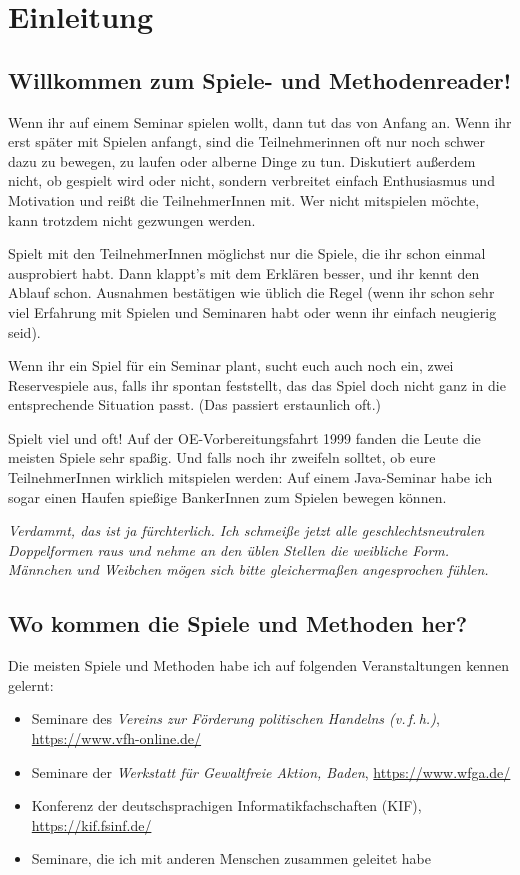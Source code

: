\chapter{Einleitung}
\section{Willkommen zum Spiele- und Methodenreader!}

Wenn ihr auf einem Seminar spielen wollt, dann tut das von Anfang an. Wenn ihr erst später mit Spielen anfangt, sind die Teilnehmerinnen oft nur noch schwer dazu zu bewegen, zu laufen oder alberne Dinge zu tun. Diskutiert außerdem nicht, ob gespielt wird oder nicht, sondern verbreitet einfach Enthusiasmus und Motivation und reißt die TeilnehmerInnen mit. Wer nicht mitspielen möchte, kann trotzdem nicht gezwungen werden.

Spielt mit den TeilnehmerInnen möglichst nur die Spiele, die ihr schon einmal ausprobiert habt. Dann klappt's mit dem Erklären besser, und ihr kennt den Ablauf schon. Ausnahmen bestätigen wie üblich die Regel (wenn ihr schon sehr viel Erfahrung mit Spielen und Seminaren habt oder wenn ihr einfach neugierig seid).

Wenn ihr ein Spiel für ein Seminar plant, sucht euch auch noch ein, zwei Reservespiele aus, falls ihr spontan feststellt, das das Spiel doch nicht ganz in die entsprechende Situation passt. (Das passiert erstaunlich oft.)

Spielt viel und oft! Auf der OE-Vorbereitungsfahrt 1999 fanden die Leute die meisten Spiele sehr spaßig. Und falls noch ihr zweifeln solltet, ob eure TeilnehmerInnen wirklich mitspielen werden: Auf einem Java-Seminar habe ich sogar einen Haufen spießige BankerInnen zum Spielen bewegen können.

\emph{Verdammt, das ist ja fürchterlich. Ich schmeiße jetzt alle geschlechtsneutralen Doppelformen raus und nehme an den üblen Stellen die weibliche Form. Männchen und Weibchen mögen sich bitte gleichermaßen angesprochen fühlen.}

\section{Wo kommen die Spiele und Methoden her?}
Die meisten Spiele und Methoden habe ich auf folgenden Veranstaltungen kennen gelernt:
\begin{itemize}
  \item Seminare des \emph{Vereins zur Förderung politischen Handelns (v.\,f.\,h.)}, \url{https://www.vfh-online.de/}
  \item Seminare der \emph{Werkstatt für Gewaltfreie Aktion, Baden}, \url{https://www.wfga.de/}
  \item Konferenz der deutschsprachigen Informatikfachschaften (KIF), \url{https://kif.fsinf.de/}
  \item Seminare, die ich mit anderen Menschen zusammen geleitet habe
\end{itemize}

